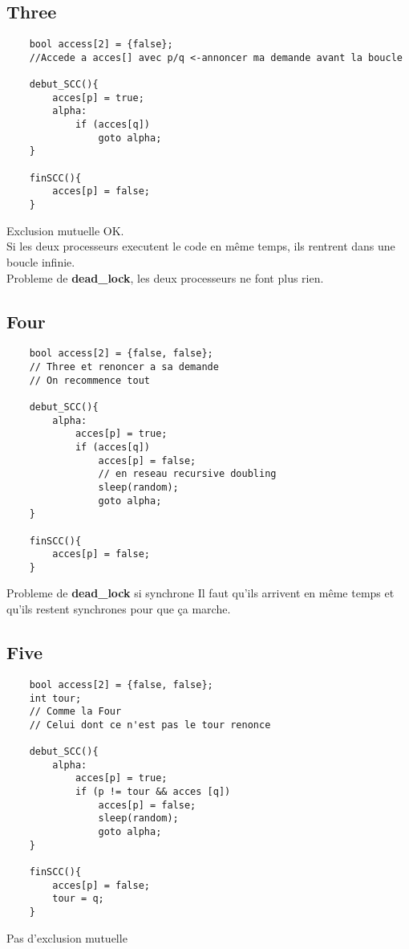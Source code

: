\documentclass[11pt]{article}
\begin{document}
\pagebreak

\subsection{Three}
\begin{verbatim}
	bool access[2] = {false};
	//Accede a acces[] avec p/q <-annoncer ma demande avant la boucle 

	debut_SCC(){
		acces[p] = true;
		alpha:
			if (acces[q])
				goto alpha;
	}

	finSCC(){
		acces[p] = false;
	}
\end{verbatim}
Exclusion mutuelle OK.\\
Si les deux processeurs executent le code en même temps, ils rentrent dans une boucle infinie.\\
Probleme de \textbf{dead\_lock}, les deux processeurs ne font plus rien.

\subsection{Four}
\begin{verbatim}
	bool access[2] = {false, false};
	// Three et renoncer a sa demande
	// On recommence tout

	debut_SCC(){
		alpha:
			acces[p] = true;
			if (acces[q])
				acces[p] = false;
				// en reseau recursive doubling
				sleep(random); 
				goto alpha;
	}

	finSCC(){
		acces[p] = false;
	}
\end{verbatim}
Probleme de \textbf{dead\_lock} si synchrone
Il faut qu'ils arrivent en même temps et qu'ils restent synchrones pour que ça marche.

\pagebreak

\subsection{Five}

\begin{verbatim}
	bool access[2] = {false, false};
	int tour;
	// Comme la Four
	// Celui dont ce n'est pas le tour renonce

	debut_SCC(){
		alpha:
			acces[p] = true;
			if (p != tour && acces [q])
				acces[p] = false;
				sleep(random); 
				goto alpha;
	}

	finSCC(){
		acces[p] = false;
		tour = q;
	}
\end{verbatim}
Pas d'exclusion mutuelle
\end{document}
